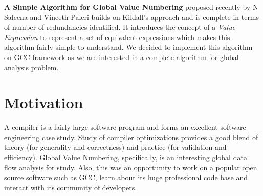 \textbf{A Simple Algorithm for Global Value Numbering} proposed recently by N Saleena and Vineeth Paleri\cite{sagvn} builds on Kildall's approach and is complete in terms of number of redundancies identified. It introduces the concept of a \emph{Value Expression} to represent a set of equivalent expressions which makes this algorithm fairly simple to understand. We decided to implement this algorithm on GCC framework as we are interested in a complete algorithm for global analysis problem.

\section{Motivation}
A compiler is a fairly large software program and forms an excellent software engineering case study. Study of compiler optimizations provides a good blend of theory (for generality and correctness) and practice (for validation and efficiency). Global Value Numbering, specifically, is an interesting global data flow analysis for study. Also, this was an opportunity to work on a popular open source software such as GCC, learn about its huge professional code base and interact with its community of developers.
